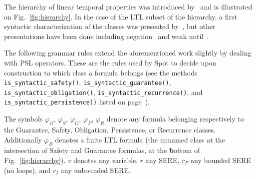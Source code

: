 \documentclass[a4paper,twoside,10pt,DIV=12]{scrreprt}
\newcommand{\0}{\texttt{0}}
\newcommand{\1}{\texttt{1}}
\begin{document}
\begin{figure}[tbp]
\begin{captionbeside}
  \end{captionbeside}
\end{figure}

The hierarchy of linear temporal properties was introduced
by~\citet{manna.87.podc} and is illustrated on
Fig.~\ref{fig:hierarchy}.  In the case of the LTL subset of the
hierarchy, a first syntactic characterization of the classes was
presented by~\citet{chang.92.icalp}, but other presentations have been
done including negation~\citep{cerna.03.mfcs} and weak
until~\citep{schneider.01.lpar}.

The following grammar rules extend the aforementioned work slightly by
dealing with PSL operators.  These are the rules used by Spot to
decide upon construction to which class a formula belongs (see the
methods \texttt{is\_syntactic\_safety()},
\texttt{is\_syntactic\_guarantee()},
\texttt{is\_syntactic\_obligation()},
\texttt{is\_syntactic\_recurrence()}, and
\texttt{is\_syntactic\_persistence()} listed on
page~\pageref{property-methods}).

The symbols $\varphi_G$, $\varphi_S$, $\varphi_O$, $\varphi_P$,
$\varphi_R$ denote any formula belonging respectively to the
Guarantee, Safety, Obligation, Persistence, or Recurrence classes.
Additionally $\varphi_B$ denotes a finite LTL formula (the unnamed
class at the intersection of Safety and Guarantee formulas, at the
\textbf{b}ottom of Fig.~\ref{fig:hierarchy}).  $v$ denotes any
variable, $r$ any SERE, $r_F$ any bounded SERE (no loops), and $r_I$
any unbounded SERE.
\end{document}
